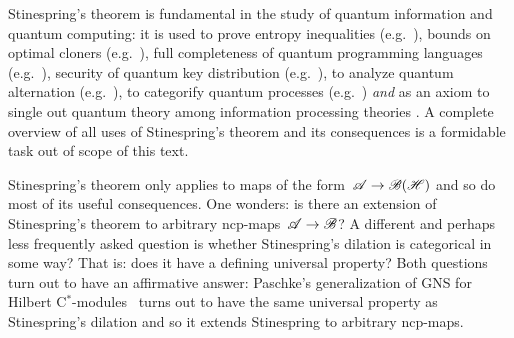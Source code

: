 \documentclass[b]{subfiles}
\begin{document}
\begin{parsec}
\begin{point}%
Stinespring's theorem
is fundamental in the study
of quantum information and quantum computing:
it is used to prove entropy inequalities (e.g.~\cite{lindblad}),
bounds on optimal cloners (e.g.~\cite{werner}),
full completeness of quantum programming languages (e.g.~\cite{staton}),
security of quantum key distribution (e.g.~\cite{werner2,kissinger2017picture}),
to analyze quantum alternation (e.g.~\cite{prakash}),
to categorify quantum processes (e.g.~\cite{selinger}) \emph{and}
as an axiom to single out
quantum theory among information processing theories \cite{chiribella}.
A complete overview of all uses of Stinespring's theorem and its consequences
is a formidable task out of scope of this text.

Stinespring's theorem only applies
to maps of the form~$\mathscr{A} \to \mathscr{B}(\mathscr{H})$
    and so do most of its useful consequences.
One wonders:
    is there an extension of Stinespring's theorem
    to arbitrary ncp-maps~$\mathscr{A} \to \mathscr{B}$?
A different and perhaps less frequently asked question is whether
     Stinespring's dilation is categorical in some way?
That is: does it have a defining universal property?
Both questions turn out to have an affirmative answer:
Paschke's generalization of GNS for Hilbert C$^*$-modules~\cite{paschke}
    turns out to have the same universal property
        as Stinespring's dilation and so it extends Stinespring
        to arbitrary ncp-maps.


\end{point}
\end{parsec}
\end{document}
